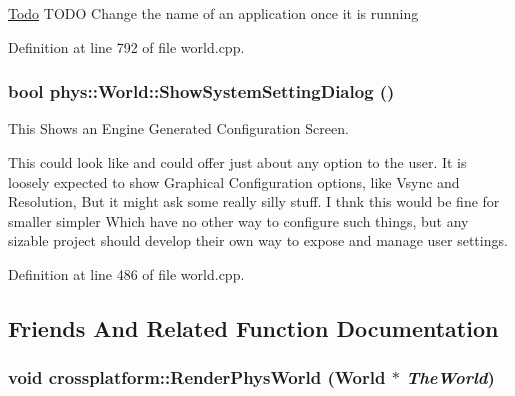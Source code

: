 \begin{Desc}
\item[\hyperlink{todo__todo000021}{Todo}]TODO Change the name of an application once it is running \end{Desc}




Definition at line 792 of file world.cpp.

\hypertarget{classphys_1_1World_a0d8ce136bebe81a6826b7e202a531f6a}{
\subsubsection[{ShowSystemSettingDialog}]{\setlength{\rightskip}{0pt plus 5cm}bool phys::World::ShowSystemSettingDialog ()}}
\label{da/ddf/classphys_1_1World_a0d8ce136bebe81a6826b7e202a531f6a}


This Shows an Engine Generated Configuration Screen. 

This could look like and could offer just about any option to the user. It is loosely expected to show Graphical Configuration options, like Vsync and Resolution, But it might ask some really silly stuff. I thnk this would be fine for smaller simpler Which have no other way to configure such things, but any sizable project should develop their own way to expose and manage user settings. 

Definition at line 486 of file world.cpp.



\subsection{Friends And Related Function Documentation}
\hypertarget{classphys_1_1World_ac7946bdb41c7884bcd7cfdec2b5358f0}{
\subsubsection[{crossplatform::RenderPhysWorld}]{\setlength{\rightskip}{0pt plus 5cm}void crossplatform::RenderPhysWorld ({\bf World} $\ast$ {\em TheWorld})}}
\label{da/ddf/classphys_1_1World_ac7946bdb41c7884bcd7cfdec2b5358f0}


